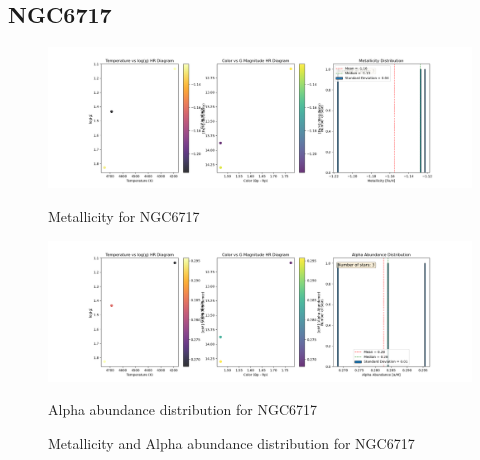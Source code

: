 \documentclass[a4paper,12pt]{article}
\begin{document}
\subsection{NGC6717}
\begin{figure}[H]
    \centering
    \begin{minipage}[b]{0.8\textwidth}
        \centering
        \includegraphics[width=\textwidth]{NGC6717_metalicity.png}
        \caption{Metallicity for NGC6717}
        \label{fig:NGC6717_metalicity}
    \end{minipage}
    \hfill
    \begin{minipage}[b]{0.8\textwidth}
        \centering
        \includegraphics[width=\textwidth]{NGC6717_alpha.png}
        \caption{Alpha abundance distribution for NGC6717}
        \label{fig:NGC6717_alpha}
    \end{minipage}
    \caption{Metallicity and Alpha abundance distribution for NGC6717}
    \label{fig:NGC6717_combined}
\end{figure}
\clearpage
\end{document}
